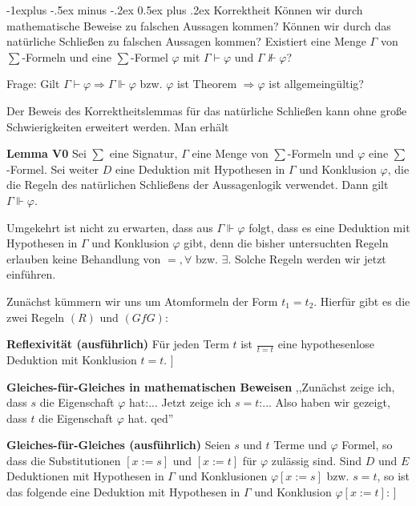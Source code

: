 \documentclass[a4paper]{article}
\makeatletter
\renewcommand{\note}[2]{\begin{noteBox} \textbf{#1} #2 \end{noteBox}}
\renewcommand{\subsection}{\@startsection{subsection}{2}{0mm}%
                {-1explus -.5ex minus -.2ex}%
                {0.5ex plus .2ex}%
                {\normalfont\normalsize\bfseries}}
\makeatother
\begin{document}
\begin{multicols}{3}
  \subsection{Korrektheit}
  Können wir durch mathematische Beweise zu falschen Aussagen kommen? Können wir durch das natürliche Schließen zu falschen Aussagen kommen? Existiert eine Menge $\Gamma$ von $\sum$-Formeln und eine $\sum$-Formel $\varphi$ mit $\Gamma\vdash\varphi$ und
  $\Gamma\not\Vdash\varphi$?

  Frage: Gilt $\Gamma\vdash\varphi\Rightarrow \Gamma\Vdash\varphi$ bzw. $\varphi$ ist Theorem $\Rightarrow\varphi$ ist allgemeingültig?

  Der Beweis des Korrektheitslemmas für das natürliche Schließen kann ohne große Schwierigkeiten erweitert werden. Man erhält

  \note{Lemma V0}{Sei $\sum$ eine Signatur, $\Gamma$ eine Menge von $\sum$-Formeln und $\varphi$ eine $\sum$-Formel. Sei weiter $D$ eine Deduktion mit Hypothesen in $\Gamma$ und Konklusion $\varphi$, die die Regeln des natürlichen Schließens der Aussagenlogik verwendet. Dann gilt $\Gamma\Vdash\varphi$.}

  Umgekehrt ist nicht zu erwarten, dass aus $\Gamma\Vdash\varphi$ folgt, dass es eine Deduktion mit Hypothesen in $\Gamma$ und Konklusion $\varphi$ gibt, denn die bisher untersuchten Regeln erlauben keine Behandlung von $=,\forall$ bzw. $\exists$. Solche Regeln werden wir jetzt einführen.

  Zunächst kümmern wir uns um Atomformeln der Form $t_1 =t_2$. Hierfür gibt es die zwei Regeln $(R)$ und $(GfG)$:

  \note{Reflexivität (ausführlich)}{Für jeden Term $t$ ist $\frac{}{t=t}$ eine hypothesenlose Deduktion mit Konklusion $t=t$.
  ]}

  \note{Gleiches-für-Gleiches in mathematischen Beweisen}{
    ,,Zunächst zeige ich, dass $s$ die Eigenschaft $\varphi$ hat:...
    Jetzt zeige ich $s=t$:...
    Also haben wir gezeigt, dass $t$ die Eigenschaft $\varphi$ hat. qed''}

  \note{Gleiches-für-Gleiches (ausführlich)}{Seien $s$ und $t$ Terme und $\varphi$ Formel, so dass die Substitutionen $[x:=s]$ und $[x:=t]$ für $\varphi$ zulässig sind. Sind $D$ und $E$ Deduktionen mit Hypothesen in $\Gamma$ und Konklusionen $\varphi[x:=s]$ bzw. $s=t$, so ist das folgende eine Deduktion mit Hypothesen in $\Gamma$ und Konklusion $\varphi[x:=t]$:
  ]}


\end{multicols}
\end{document}
